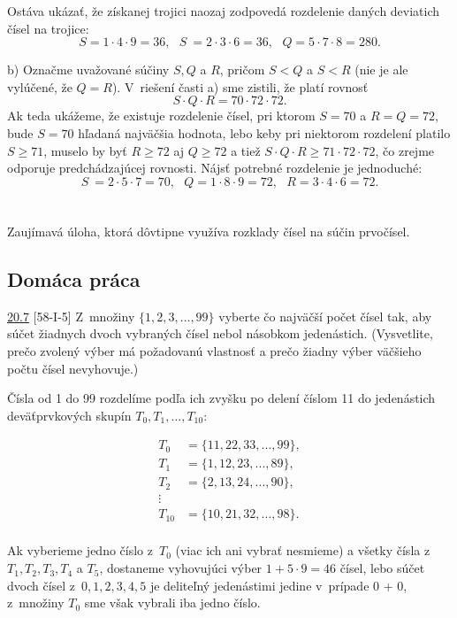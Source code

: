 Ostáva ukázať, že získanej trojici naozaj zodpovedá rozdelenie daných deviatich čísel na trojice:
$$S = 1 \cdot 4 \cdot 9 = 36, \ \ \ S~= 2 \cdot 3 \cdot 6 = 36, \ \ \ Q = 5 \cdot 7 \cdot 8 = 280.$$

b) Označme uvažované súčiny $S, Q$ a $R$, pričom $S < Q$ a $S < R$ (nie je ale vylúčené, že $Q = R$). V~riešení časti a) sme zistili, že platí rovnosť
$$S \cdot Q \cdot R = 70 \cdot 72 \cdot 72.$$
Ak teda ukážeme, že existuje rozdelenie čísel, pri ktorom $S = 70$ a $R = Q = 72$, bude $S = 70$ hľadaná najväčšia hodnota, lebo keby pri niektorom rozdelení platilo $S \geq 71$, muselo by byť $R \geq 72$ aj $Q \geq 72$ a tiež $S \cdot Q \cdot R \geq 71 \cdot 72 \cdot 72$, čo zrejme odporuje predchádzajúcej rovnosti. Nájsť potrebné rozdelenie je jednoduché:
$$ S~= 2 \cdot 5 \cdot 7 = 70, \ \ \ Q = 1 \cdot 8 \cdot 9 = 72, \ \ \  R = 3 \cdot 4 \cdot 6 = 72.$$ \\
\\
\kom Zaujímavá úloha, ktorá dôvtipne využíva rozklady čísel na súčin prvočísel.

\subsection*{Domáca práca}
\begin{tcolorbox}[breakable,notitle,boxrule=0pt,colback=light-gray,colframe=light-gray]\ul{20.7} [58-I-5] Z~množiny $\{1, 2, 3, \ldots, 99\}$ vyberte čo najväčší počet čísel tak, aby súčet žiadnych dvoch vybraných čísel nebol násobkom jedenástich. (Vysvetlite, prečo zvolený výber má požadovanú vlastnosť a prečo žiadny výber väčšieho počtu čísel nevyhovuje.)

\end{tcolorbox}

\rieh Čísla od 1 do 99 rozdelíme podľa ich zvyšku po delení číslom 11 do jedenástich deväťprvkových skupín $T_0, T_1 ,\ldots, T_{10}$:
\begin{center}
\begin{align*}
T_0 &= \{11, 22, 33, . . . , 99\},\\
T_1 &= \{1, 12, 23, . . . , 89\},\\
T_2 &= \{2, 13, 24, . . . , 90\},\\
\vdots\\
T_{10} &= \{10, 21, 32, . . . , 98\}.\\
\end{align*}
\end{center}
Ak vyberieme jedno číslo z~$T_0$ (viac ich ani vybrať nesmieme) a všetky čísla z~$T_1, T_2, T_3, T_4$ a $T_5$, dostaneme vyhovujúci výber $1 + 5 \cdot 9 = 46$ čísel, lebo súčet dvoch čísel z~$0, 1, 2, 3, 4, 5$ je deliteľný jedenástimi jedine v~prípade 0 + 0, z~množiny $T_0$ sme však vybrali iba jedno číslo.

